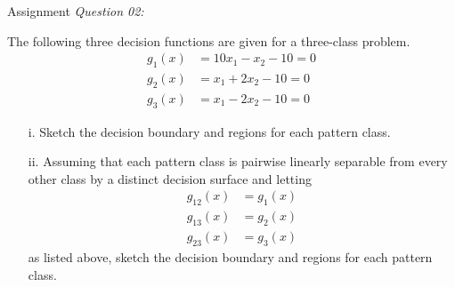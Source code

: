 


\begin{frame}{Assignment}
\textit{\color{slidecolor}Question 02:}
\begin{footnotesize}
The following three decision functions are given for a three-class problem.
\begin{align}
{g_1}(x) &= 10{x_1} - {x_2} - 10 = 0 \nonumber\\
{g_2}(x) &= {x_1} + 2{x_2} - 10 = 0 \nonumber\\
{g_3}(x) &= {x_1} - 2{x_2} - 10 = 0 \nonumber
\end{align}
\begin{itemize}
\item [i.] Sketch the decision boundary and regions for each pattern class.
\item [ii.] Assuming that each pattern class is pairwise linearly separable from every other class by a distinct decision surface and letting
\begin{align}
{g_{12}}(x) &= g_1(x) \nonumber\\
{g_{13}}(x) &= g_2(x) \nonumber\\
{g_{23}}(x) &= g_3(x) \nonumber
\end{align}
as listed above, sketch the decision boundary and regions for each pattern class.
\end{itemize}
\end{footnotesize}
\end{frame}


